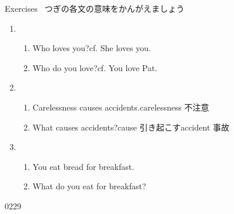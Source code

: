 \documentclass[aspectratio=169,xcolor={dvipsnames,table}]{beamer}
\begin{document}
\begin{frame}[plain]{Exercises}
\textdbend\,\,\,つぎの各文の意味をかんがえましょう

\begin{enumerate}
 \item \begin{enumerate}
		  \item Who loves you?\hfill{}cf. She loves you.
		  \item Who do you love?\hfill{}cf. You love Pat. 
		 \end{enumerate}
 \item \begin{enumerate}
	\item Carelessness causes accidents.\hfill{\scriptsize carelessness  不注意}
	\item What causes accidents?\hfill{\scriptsize cause  引き起こす\hspace{10pt}accident  事故}
       \end{enumerate}
 \item \begin{enumerate}
	\item You eat bread for breakfast.
	\item What do you eat for breakfast?
       \end{enumerate}
\end{enumerate}
\hfill{\tiny 0229}\,{\scriptsize {}}

\end{frame}
\end{document}
